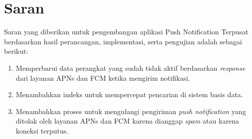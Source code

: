 \section{Saran}
\par Saran yang diberikan untuk pengembangan aplikasi Push Notification Terpusat berdasarkan hasil perancangan, implementasi, serta pengujian adalah sebagai berikut:
\begin{enumerate}
    \item Memperbarui data perangkat yang sudah tidak aktif berdasarkan \textit{response} dari layanan APNs dan FCM ketika mengirim notifikasi.
    \item Menambahkan indeks untuk mempercepat pencarian di sistem basis data.
    \item Menambahkan proses untuk mengulangi pengiriman \textit{push notification} yang ditolak oleh layanan APNs dan FCM karena dianggap \textit{spam} atau karena koneksi terputus.
\end{enumerate}
